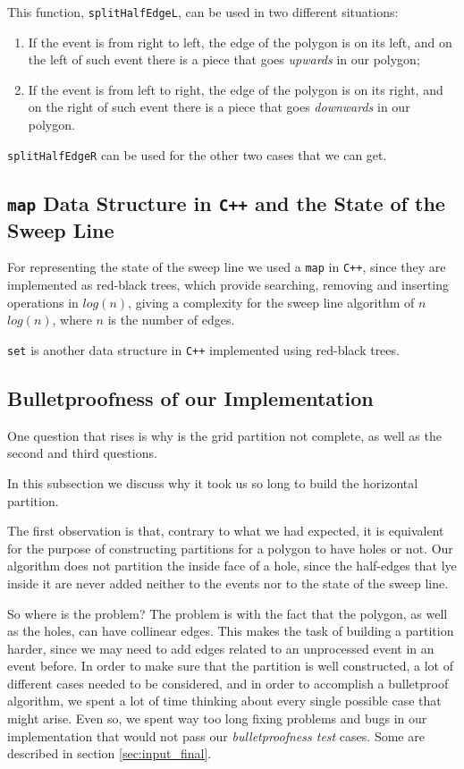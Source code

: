 \documentclass[12pt,a4paper,oneside]{article}
\begin{document}
This function, \texttt{splitHalfEdgeL}, can be used in two different situations:

\begin{enumerate}
	\item If the event is from right to left, the edge of the polygon is on its left, and on the left of such event there is a piece that goes \textit{upwards} in our polygon;
	\item If the event is from left to right, the edge of the polygon is on its right, and on the right of such event there is a piece that goes \textit{downwards} in our polygon.
\end{enumerate}

\texttt{splitHalfEdgeR} can be used for the other two cases that we can get.

\subsection{\texttt{map} Data Structure in \texttt{C++} and the State of the Sweep Line}

For representing the state of the sweep line we used a \texttt{map} in \texttt{C++}, since they are implemented as red-black trees, which provide searching, removing and inserting operations in $log(n)$, giving a complexity for the sweep line algorithm of $n$ $log(n)$, where $n$ is the number of edges.

\texttt{set} is another data structure in \texttt{C++} implemented using red-black trees.

\subsection{Bulletproofness of our Implementation}\label{subsec:bullet}

One question that rises is why is the grid partition not complete, as well as the second and third questions.

In this subsection we discuss why it took us so long to build the horizontal partition.

The first observation is that, contrary to what we had expected, it is equivalent for the purpose of constructing partitions for a polygon to have holes or not. Our algorithm does not partition the inside face of a hole, since the half-edges that lye inside it are never added neither to the events nor to the state of the sweep line.

So where is the problem? The problem is with the fact that the polygon, as well as the holes, can have collinear edges. This makes the task of building a partition harder, since we may need to add edges related to an unprocessed event in an event before. In order to make sure that the partition is well constructed, a lot of different cases needed to be considered, and in order to accomplish a bulletproof algorithm, we spent a lot of time thinking about every single possible case that might arise. Even so, we spent way too long fixing problems and bugs in our implementation that would not pass our \textit{bulletproofness test} cases. Some are described in section \ref{sec:input_final}.
\end{document}
